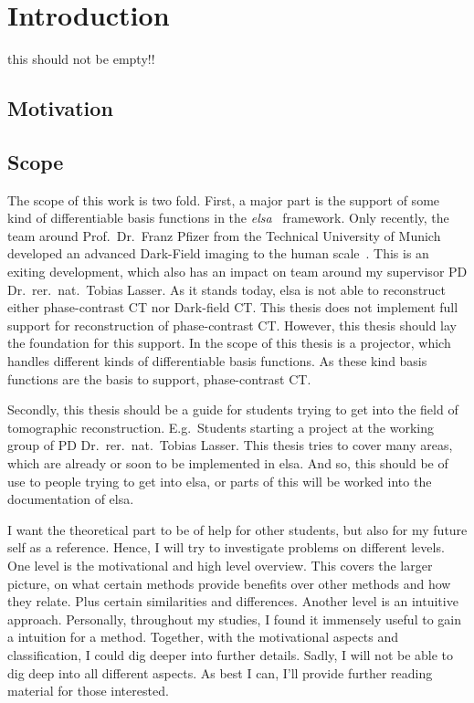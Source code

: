 \chapter{Introduction}\label{chap:introduction}

this should not be empty!!

\section{Motivation}\label{chap:Motivation}

\section{Scope}\label{chap:scope}

The scope of this work is two fold. First, a major part is the support of some kind of
differentiable basis functions in the \textit{elsa}~\cite{lasser_elsa_2019} framework. Only
recently, the team around Prof.\ Dr.\ Franz Pfizer from the Technical University of Munich developed
an advanced Dark-Field imaging to the human scale~\cite{viermetz_dark-field_2022}. This is an
exiting development, which also has an impact on team around my supervisor PD Dr.\ rer.\ nat.\
Tobias Lasser. As it stands today, elsa is not able to reconstruct either phase-contrast CT nor Dark-field
CT\@. This thesis does not implement full support for reconstruction of phase-contrast CT\@.
However, this thesis should lay the foundation for this support. In the scope of this thesis is a
projector, which handles different kinds of differentiable basis functions. As these kind basis
functions are the basis to support, phase-contrast CT\@.

Secondly, this thesis should be a guide for students trying to get into the field of tomographic
reconstruction. E.g.\ Students starting a project at the working group of PD Dr.\ rer.\ nat.\ Tobias
Lasser. This thesis tries to cover many areas, which are already or soon to be implemented in elsa.
And so, this should be of use to people trying to get into elsa, or parts of this will be worked
into the documentation of elsa.

I want the theoretical part to be of help for other students, but also for my future self as a
reference. Hence, I will try to investigate problems on different levels. One level is the
motivational and high level overview. This covers the larger picture, on what certain methods
provide benefits over other methods and how they relate. Plus certain similarities and differences.
Another level is an intuitive approach. Personally, throughout my studies, I found it immensely
useful to gain a intuition for a method. Together, with the motivational aspects and classification,
I could dig deeper into further details. Sadly, I will not be able to dig deep into all different
aspects. As best I can, I'll provide further reading material for those interested.


